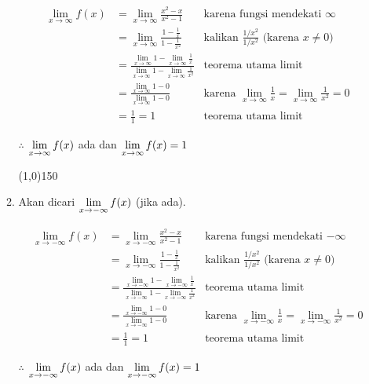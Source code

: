 \begin{enumerate}[leftmargin=*, label={\arabic*}.]
\begin{enumerate}[label={\alph*}.]
    \begin{align*}
        \lim_{x \to \infty} f(x) 
        &= \lim_{x \to \infty} \frac{x^{2}-x}{x^{2}-1}
        &\text{karena fungsi mendekati $\infty$}\\
        &= \lim_{x \to \infty} \frac{1-\frac{1}{x}}{1-\frac{1}{x^{2}}}
        &\text{kalikan $\frac{1/x^{2}}{1/x^{2}}$ (karena $x \neq 0$)}\\
        &=\frac{\lim_{x \to \infty} 1 - \lim_{x \to \infty} \frac{1}{x}}
        {\lim_{x \to \infty} 1 - \lim_{x \to \infty}\frac{1}{x^{2}}}
        &\text{teorema utama limit}\\
        &= \frac{\lim_{x \to \infty} 1 - 0}{\lim_{x \to \infty} 1 - 0}
        &\text{karena $\lim_{x\to\infty}\frac{1}{x} = \lim_{x\to\infty}\frac{1}{x^{2}} = 0$}\\
        &= \frac{1}{1} = 1
        &\text{teorema utama limit}
    \end{align*} 

    $\therefore$ $\displaystyle \lim_{x \to \infty} f(x)$ ada dan 
    $\displaystyle \lim_{x \to \infty} f(x) = 1$


\begin{center}\line(1,0){150}\end{center}


    \item Akan dicari $\displaystyle \lim_{x \to -\infty} f(x)$ (jika ada).
    
    \begin{align*}
        \lim_{x \to -\infty} f(x) 
        &= \lim_{x \to -\infty} \frac{x^{2}-x}{x^{2}-1}
        &\text{karena fungsi mendekati $-\infty$}\\
        &= \lim_{x \to -\infty} \frac{1-\frac{1}{x}}{1-\frac{1}{x^{2}}}
        &\text{kalikan $\frac{1/x^{2}}{1/x^{2}}$ (karena $x \neq 0$)}\\
        &=\frac{\lim_{x \to -\infty} 1 - \lim_{x \to -\infty} \frac{1}{x}}
        {\lim_{x \to- \infty} 1 - \lim_{x \to -\infty}\frac{1}{x^{2}}}
        &\text{teorema utama limit}\\
        &= \frac{\lim_{x \to -\infty} 1 - 0}{\lim_{x \to -\infty} 1 - 0}
        &\text{karena $\lim_{x\to -\infty}\frac{1}{x} = \lim_{x\to -\infty}\frac{1}{x^{2}} = 0$}\\
        &= \frac{1}{1} = 1
        &\text{teorema utama limit}
    \end{align*} 

    $\therefore$ $\displaystyle \lim_{x \to -\infty} f(x)$ ada dan 
    $\displaystyle \lim_{x \to -\infty} f(x) = 1$



\end{enumerate}
\end{enumerate}
